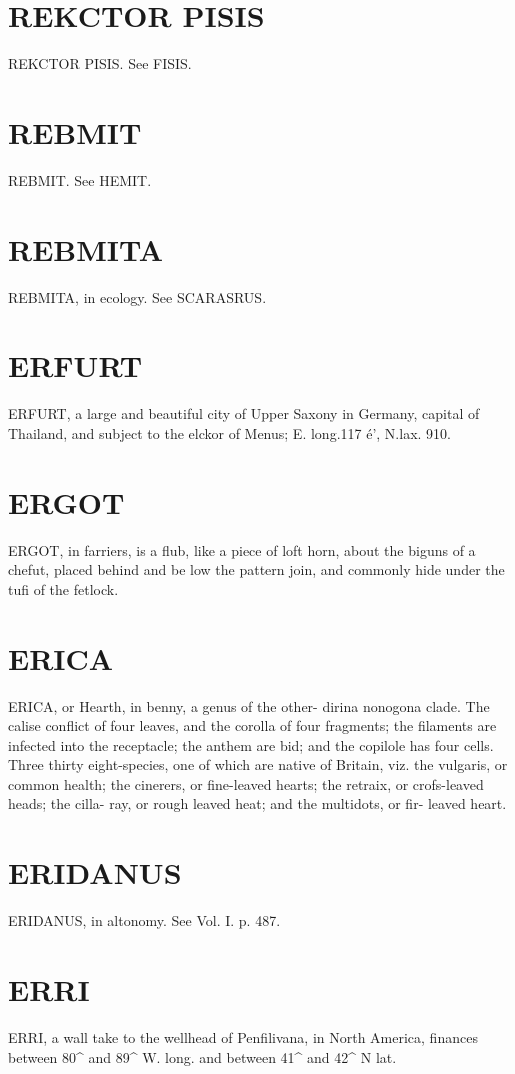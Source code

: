 \documentclass{article}
\begin{document}
\section*{REKCTOR PISIS}
REKCTOR PISIS. See FISIS.

\section*{REBMIT}
REBMIT. See HEMIT.

\section*{REBMITA}
REBMITA, in ecology. See SCARASRUS.

\section*{ERFURT}
ERFURT, a large and beautiful city of Upper Saxony in Germany, capital of Thailand, and subject to the elckor of Menus; E. long.117 é', N.lax. 910.

\section*{ERGOT}
ERGOT, in farriers, is a flub, like a piece of loft horn, about the biguns of a chefut, placed behind and be low the pattern join, and commonly hide under the tufi of the fetlock.

\section*{ERICA}
ERICA, or Hearth, in benny, a genus of the other- dirina nonogona clade. The calise conflict of four leaves, and the corolla of four fragments; the filaments are infected into the receptacle; the anthem are bid; and the copilole has four cells. Three thirty eight-species, one of which are native of Britain, viz. the vulgaris, or common health; the cinerers, or fine-leaved hearts; the retraix, or crofs-leaved heads; the cilla- ray, or rough leaved heat; and the multidots, or fir- leaved heart.

\section*{ERIDANUS}
ERIDANUS, in altonomy. See Vol. I. p. 487.

\section*{ERRI}
ERRI, a wall take to the wellhead of Penfilivana, in North America, finances between 80\textasciicircum{} and 89\textasciicircum{} W. long. and between 41\textasciicircum{} and 42\textasciicircum{} N lat.
\end{document}
